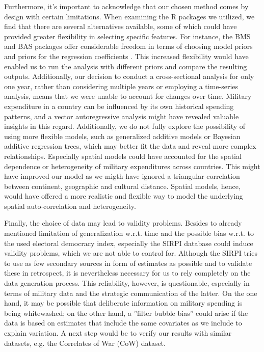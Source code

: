 \documentclass[12pt,a4paper]{article}
\begin{document}
Furthermore, it's important to acknowledge that our chosen method comes by design with certain limitations. When examining the R packages we utilized, we find that there are several alternatives available, some of which could have provided greater flexibility in selecting specific features. For instance, the BMS and BAS packages offer considerable freedom in terms of choosing model priors and priors for the regression coefficients \citep{amini2012}. This increased flexibility would have enabled us to run the analysis with different priors and compare the resulting outputs. Additionally, our decision to conduct a cross-sectional analysis for only one year, rather than considering multiple years or employing a time-series analysis, means that we were unable to account for changes over time. Military expenditure in a country can be influenced by its own historical spending patterns, and a vector autoregressive analysis might have revealed valuable insights in this regard. Additionally, we do not fully explore the possibility of using more flexible models, such as generalized additive models or Bayesian additive regression trees, which may better fit the data and reveal more complex relationships. Especially spatial models could have accounted for the spatial dependence or heterogeneity of military expenditures across countries. This might have improved our model as we migth have ignored a triangular correlation between continent, geographic and cultural distance. Spatial models, hence, would have offered a more realistic and flexible way to model the underlying spatial auto-correlation and heterogeneity.

Finally, the choice of data may lead to validity problems. Besides to already mentioned limitation of generalization w.r.t. time and the possible bias w.r.t. to the used electoral democracy index, especially the SIRPI database could induce validity problems, which we are not able to control for. Although the SIRPI tries to use as few secondary sources in form of estimates as possible and to validate these in retrospect, it is nevertheless necessary for us to rely completely on the data generation process. This reliability, however, is questionable, especially in terms of military data and the strategic communication of the latter. On the one hand, it may be possible that deliberate information on military spending is being whitewashed; on the other hand, a ''filter bubble bias'' could arise if the data is based on estimates that include the same covariates as we include to explain variation. A next step would be to verify our results with similar datasets, e.g. the Correlates of War (CoW) dataset.
\end{document}

